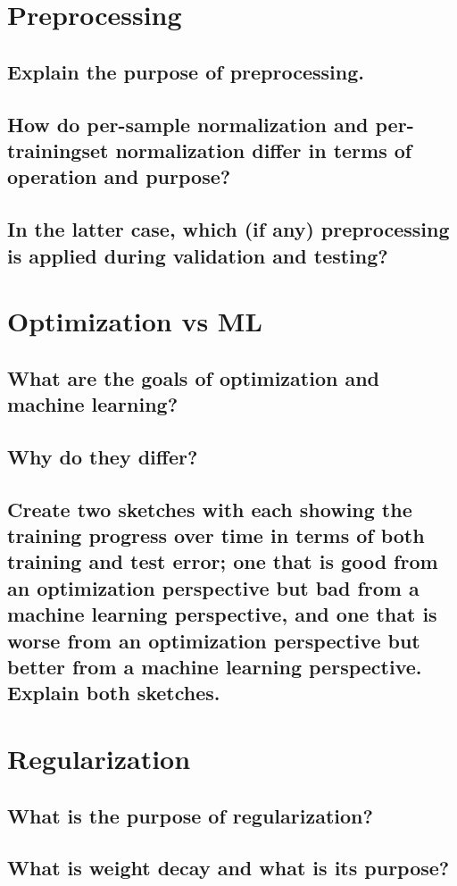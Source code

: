 \section{Preprocessing}
\subsection{Explain the purpose of preprocessing.}
\subsection{How do per-sample normalization and per-trainingset normalization differ in terms of operation and purpose?}
\subsection{In the latter case, which (if any) preprocessing is applied during validation and testing?}

\section{Optimization vs ML}
\subsection{What are the goals of optimization and machine learning?}
\subsection{Why do they differ?}
\subsection{Create two sketches with each showing the training progress over time in terms of both training and test error; one that is good from an optimization perspective but bad from a machine learning perspective, and one that is worse from an optimization perspective but better from a machine learning perspective. Explain both sketches.}

\section{Regularization}
\subsection{What is the purpose of regularization?}
\subsection{What is weight decay and what is its purpose?}
